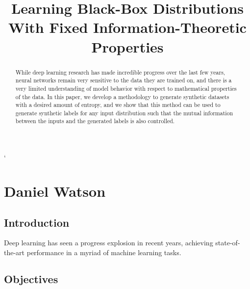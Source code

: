 \documentclass{NSF}
\begin{document}
`
\title{Learning Black-Box Distributions With Fixed Information-Theoretic Properties}
\section{Daniel Watson}

\begin{abstract}
While deep learning research has made incredible progress over the last few years,
neural networks remain very sensitive to the data they are trained on, and there is
a very limited understanding of model behavior with respect to mathematical properties
of the data. In this paper, we develop a methodology to generate synthetic datasets with
a desired amount of entropy, and we show that this method can be used to generate
synthetic labels for any input distribution such that the mutual information between the
inputs and the generated labels is also controlled.

\end{abstract}

\subsection{Introduction}
Deep learning \citep{lecun2015deep} has seen a progress explosion in recent years,
achieving state-of-the-art performance in a myriad of machine learning tasks.


\subsection{Objectives}
\end{document}
